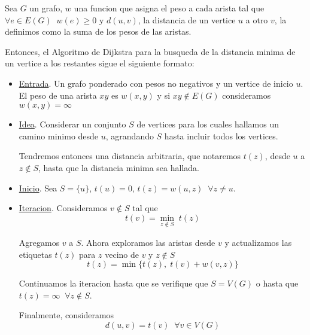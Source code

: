\documentclass[APUNTE_COMPLEMENTOS.tex]{subfiles}
\begin{document}
{
    Sea $G$ un grafo, $w$ una funcion que asigna el peso a cada arista tal que $\forall{e \in E(G)} \; \; w(e) \geq 0$ y $d(u, v)$, la distancia de un vertice $u$ a otro $v$, la definimos como la suma de los pesos de las aristas.

    Entonces, el Algoritmo de Dijkstra para la busqueda de la distancia minima de un vertice a los restantes sigue el siguiente formato:
    \begin{itemize}
        \item \underline{Entrada}. Un grafo ponderado con pesos no negativos y un vertice de inicio $u$. El peso de una arista $xy$ es $w(x, y)$ y si $xy \notin E(G)$ consideramos $w(x, y) = \infty$

        \item \underline{Idea}. Considerar un conjunto $S$ de vertices para los cuales hallamos un camino minimo desde $u$, agrandando $S$ hasta incluir todos los vertices.

        Tendremos entonces una distancia arbitraria, que notaremos $t(z)$, desde $u$ a $z \notin S$, hasta que la distancia minima sea hallada.

        \item \underline{Inicio}. Sea $S = \{u\}$, $t(u) = 0$, $t(z) = w(u, z) \; \; \forall{z \neq u}$.
        \item \underline{Iteracion}. Consideramos $v \notin S$ tal que
        \[t(v) = \min\limits_{z \notin S} \; t(z)\]

        Agregamos $v$ a $S$. Ahora exploramos las aristas desde $v$ y actualizamos las etiquetas $t(z)$ para $z$ vecino de $v$ y $z \notin S$
        \[t(z) = \min \Big\{ t(z), \; t(v) + w(v, z)\Big\} \]

        Continuamos la iteracion hasta que se verifique que $S = V(G)$ o hasta que $t(z) = \infty \; \; \forall{z \notin S}$.
        
        Finalmente, consideramos 
        \[d(u, v) = t(v) \; \; \forall{v \in V(G)}\]

    \end{itemize}
}
\end{document}
